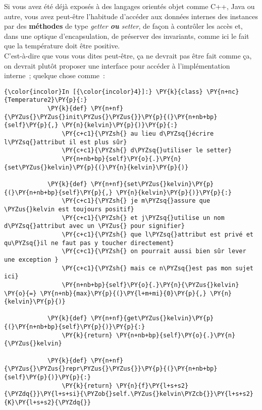    Si vous avez été déjà exposés à des langages orientés objet comme C++,
Java ou autre, vous avez peut-être l'habitude d'accéder aux données
internes des instances par des \textbf{méthodes} de type
\emph{getter\textbf{ ou }setter}, de façon à contrôler les accès et,
dans une optique d'encapsulation, de préserver des invariants, comme ici
le fait que la température doit être positive.\\

C'est-à-dire que vous vous dites peut-être, ça ne devrait pas être fait
comme ça, on devrait plutôt proposer une interface pour accéder à
l'implémentation interne~; quelque chose comme~:

    \begin{Verbatim}[commandchars=\\\{\}]
{\color{incolor}In [{\color{incolor}4}]:} \PY{k}{class} \PY{n+nc}{Temperature2}\PY{p}{:}
            \PY{k}{def} \PY{n+nf}{\PYZus{}\PYZus{}init\PYZus{}\PYZus{}}\PY{p}{(}\PY{n+nb+bp}{self}\PY{p}{,} \PY{n}{kelvin}\PY{p}{)}\PY{p}{:}
                \PY{c+c1}{\PYZsh{} au lieu d\PYZsq{}écrire l\PYZsq{}attribut il est plus sûr}
                \PY{c+c1}{\PYZsh{} d\PYZsq{}utiliser le setter}
                \PY{n+nb+bp}{self}\PY{o}{.}\PY{n}{set\PYZus{}kelvin}\PY{p}{(}\PY{n}{kelvin}\PY{p}{)}
                
            \PY{k}{def} \PY{n+nf}{set\PYZus{}kelvin}\PY{p}{(}\PY{n+nb+bp}{self}\PY{p}{,} \PY{n}{kelvin}\PY{p}{)}\PY{p}{:}
                \PY{c+c1}{\PYZsh{} je m\PYZsq{}assure que \PYZus{}kelvin est toujours positif}
                \PY{c+c1}{\PYZsh{} et j\PYZsq{}utilise un nom d\PYZsq{}attribut avec un \PYZus{} pour signifier}
                \PY{c+c1}{\PYZsh{} que l\PYZsq{}attribut est privé et qu\PYZsq{}il ne faut pas y toucher directement}
                \PY{c+c1}{\PYZsh{} on pourrait aussi bien sûr lever une exception }
                \PY{c+c1}{\PYZsh{} mais ce n\PYZsq{}est pas mon sujet ici}
                \PY{n+nb+bp}{self}\PY{o}{.}\PY{n}{\PYZus{}kelvin} \PY{o}{=} \PY{n+nb}{max}\PY{p}{(}\PY{l+m+mi}{0}\PY{p}{,} \PY{n}{kelvin}\PY{p}{)}
                
            \PY{k}{def} \PY{n+nf}{get\PYZus{}kelvin}\PY{p}{(}\PY{n+nb+bp}{self}\PY{p}{)}\PY{p}{:}
                \PY{k}{return} \PY{n+nb+bp}{self}\PY{o}{.}\PY{n}{\PYZus{}kelvin}
                
            \PY{k}{def} \PY{n+nf}{\PYZus{}\PYZus{}repr\PYZus{}\PYZus{}}\PY{p}{(}\PY{n+nb+bp}{self}\PY{p}{)}\PY{p}{:}
                \PY{k}{return} \PY{n}{f}\PY{l+s+s2}{\PYZdq{}}\PY{l+s+si}{\PYZob{}self.\PYZus{}kelvin\PYZcb{}}\PY{l+s+s2}{K}\PY{l+s+s2}{\PYZdq{}}
\end{Verbatim}


